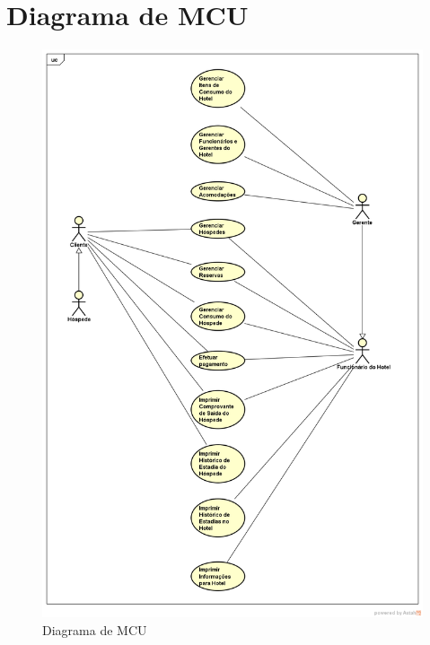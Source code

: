 \documentclass[notitlepage]{article}
\begin{document}
\section{Diagrama de MCU}
\begin{figure}[!htbp]
	\centering
  \includegraphics[scale=0.45]{MCU.png}
  \caption{Diagrama de MCU}
  \label{fig:MCU}
\end{figure}

\clearpage
\end{document}

